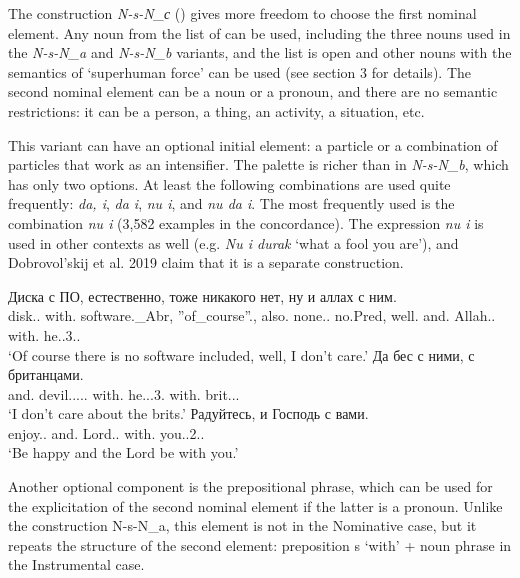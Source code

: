 \documentclass[output=paper]{langscibook}
\begin{document}
The construction \textit{N-s-N\_{с}} () gives more freedom to choose the first nominal element. Any noun from the list of  can be used, including the three nouns used in the \textit{N-s-N\_a} and \textit{N-s-N\_b} variants, and the list is open and other nouns with the semantics of ‘superhuman force’ can be used (see section 3 for details). The second nominal element can be a noun or a pronoun, and there are no semantic restrictions: it can be a person, a thing, an activity, a situation, etc.

This variant can have an optional initial element: a particle or a combination of particles that work as an intensifier. The palette is richer than in \textit{N-s-N\_b}, which has only two options. At least the following combinations are used quite frequently: \textit{da, i}, \textit{da i}, \textit{nu i}, and \textit{nu da i}. The most frequently used is the combination \textit{nu i} (3,582 examples in the concordance). The expression \textit{nu i} is used in other contexts as well (e.g. \textit{Nu i durak} ‘what a fool you are’), and Dobrovol’skij et al. 2019 claim that it is a separate construction.


\ea
\ea
\gll Диска с ПО, естественно, тоже никакого нет, ну и аллах с ним.\\
     disk.{\NOUN}.{\GEN}{\SG} with.{\PREP} software.{\NOUN}\_Abr, ”of\_course”.{\ADV}, also.{\PTCP} none.{\PRON}.{\GEN}{\SG} no.Pred, well.{\PTCP} and.{\PTCP} Allah.{\NOUN}.{\NOM} with.{\PREP} he.{\PRON}.3.{\INSTR}.{\SG}\\
\glt `Of course there is no software included, well, I don’t care.'
\ex
\gll Да бес с ними, с британцами.\\
     and.{\PTCP} devil.{\NOUN}.{\NOM}.{\NOUN}.{\NOM}.{\SG} with.{\PREP} he.{\PRON}.{\INSTR}.3.{\PL} with.{\PREP} brit.{\NOUN}.{\INSTR}.{\PL}\\
\glt `I don’t care about the brits.'
\ex
\gll Радуйтесь, и Господь с вами.\\
     enjoy.{\IMP}.{\PL} and.{\PTCP} Lord.{\NOUN}.{\NOM} with.{\PREP} you.{\PRON}.2.{\INSTR}.{\PL}\\
\glt `Be happy and the Lord be with you.'
\z
\z

Another optional component is the prepositional phrase, which can be used for the explicitation of the second nominal element if the latter is a pronoun. Unlike the construction N-s-N\_a, this element is not in the Nominative case, but it repeats the structure of the second element: preposition s ‘with’ + noun phrase in the Instrumental case.
\end{document}
